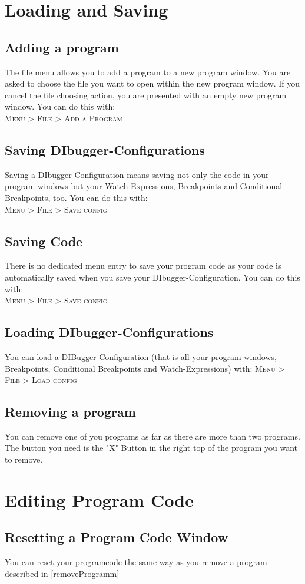 \documentclass[parskip=full]{memoir}
\begin{document}
\chapter{Loading and Saving} %
\section{Adding a program}
The file menu allows you to add a program to a new program window. You are asked to choose the file you want to open within the new program window. If you cancel the file choosing action, you are presented with an empty new program window. You can do this with: \\
 \textsc{Menu > File > Add a Program}
 \section{Saving DIbugger-Configurations}
Saving a DIbugger-Configuration means saving not only the code in your program windows but your Watch-Expressions, Breakpoints and Conditional Breakpoints, too.
You can do this with: \\
\textsc{Menu > File > Save config}
\section{Saving Code}
There is no dedicated menu entry to save your program code as your code is automatically saved when you save your DIbugger-Configuration. You can do this with: \\
\textsc{Menu > File > Save config}
\section{Loading DIbugger-Configurations}
You can load a DIBugger-Configuration (that is all your program windows, Breakpoints, Conditional Breakpoints and Watch-Expressions) with:
\textsc{Menu > File > Load config}
\section{Removing a program}\label{removeProgram}
You can remove one of you programs as far as there are more than two programs. 
The button you need is the "X" Button in the right top of the program you want to remove.
\chapter{Editing Program Code} %
\section{Resetting a Program Code Window}
You can reset your programcode the same way as you remove a program described in \ref{removeProgramm}
\end{document}

